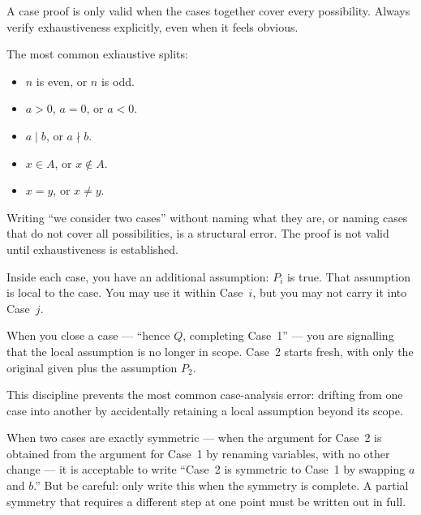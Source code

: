 \begin{remark}
A case proof is only valid when the cases together cover every
possibility. Always verify exhaustiveness explicitly, even when it
feels obvious.

The most common exhaustive splits:
\begin{itemize}[itemsep=2pt]
  \item $n$ is even, or $n$ is odd.
  \item $a > 0$, $a = 0$, or $a < 0$.
  \item $a \mid b$, or $a \nmid b$.
  \item $x \in A$, or $x \notin A$.
  \item $x = y$, or $x \neq y$.
\end{itemize}

Writing ``we consider two cases'' without naming what they are, or
naming cases that do not cover all possibilities, is a structural error.
The proof is not valid until exhaustiveness is established.
\end{remark}

\begin{remark}
Inside each case, you have an additional assumption: $P_i$ is true.
That assumption is local to the case. You may use it within Case~$i$,
but you may not carry it into Case~$j$.

When you close a case --- ``hence $Q$, completing Case~1'' --- you
are signalling that the local assumption is no longer in scope.
Case~2 starts fresh, with only the original given plus the assumption $P_2$.

This discipline prevents the most common case-analysis error: drifting
from one case into another by accidentally retaining a local assumption
beyond its scope.
\end{remark}

\begin{remark}
When two cases are exactly symmetric --- when the argument for Case~2
is obtained from the argument for Case~1 by renaming variables, with
no other change --- it is acceptable to write ``Case~2 is symmetric
to Case~1 by swapping $a$ and $b$.'' But be careful: only write this
when the symmetry is complete. A partial symmetry that requires a
different step at one point must be written out in full.
\end{remark}

